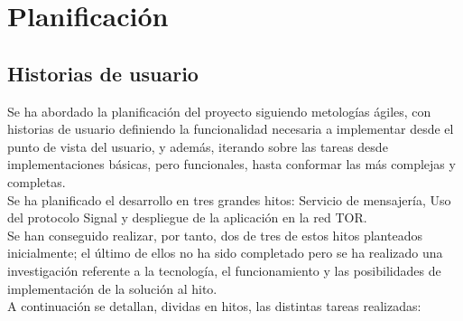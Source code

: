 \chapter{Planificación}

\section{Historias de usuario}

Se ha abordado la planificación del proyecto siguiendo metologías ágiles, con historias de usuario definiendo la funcionalidad necesaria a implementar desde el punto de vista del usuario, y además, iterando sobre las tareas desde implementaciones básicas, pero funcionales, hasta conformar las más complejas y completas. \\ 

Se ha planificado el desarrollo en tres grandes hitos: Servicio de mensajería, Uso del protocolo Signal y despliegue de la aplicación en la red TOR. \\
Se han conseguido realizar, por tanto, dos de tres de estos hitos planteados inicialmente; el último de ellos no ha sido completado pero se ha realizado una investigación referente a la tecnología, el funcionamiento y las posibilidades de implementación de la solución al hito. \\ 

A continuación se detallan, dividas en hitos, las distintas tareas realizadas: \\ 


